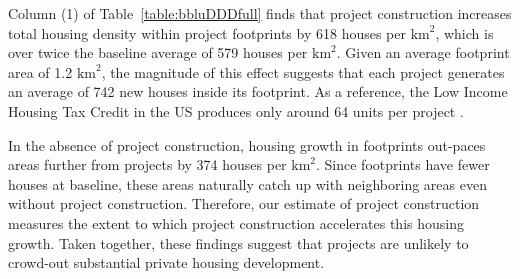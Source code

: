 \documentclass[12pt]{article}
\begin{document}
Column (1) of Table~\ref{table:bbluDDDfull} finds that project construction increases total housing density within project footprints by 618 houses per $\text{km}^{2}$, which is over twice the baseline average of 579 houses per $\text{km}^{2}$.  Given an average footprint area of 1.2 $\text{km}^{2}$, the magnitude of this effect suggests that each project generates an average of 742 new houses inside its footprint.  As a reference, the Low Income Housing Tax Credit in the US produces only around 64 units per project \citep{diamond2016wants}.

In the absence of project construction, housing growth in footprints out-paces areas further from projects by 374 houses per $\text{km}^{2}$.  Since footprints have fewer houses at baseline, these areas naturally catch up with neighboring areas even without project construction.  Therefore, our estimate of project construction measures the extent to which project construction accelerates this housing growth.  Taken together, these findings suggest that projects are unlikely to crowd-out substantial private housing development.  






\end{document}
